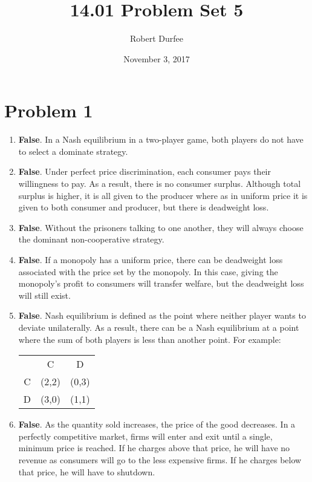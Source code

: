 \documentclass{article}
\title{14.01 Problem Set 5}
\author{Robert Durfee}
\date{November 3, 2017}
\begin{document}
\maketitle

\section*{Problem 1}

\begin{enumerate}
    \item \textbf{False}. In a Nash equilibrium in a two-player game, both
        players do not have to select a dominate strategy.
    \item \textbf{False}. Under perfect price discrimination, each consumer pays
        their willingness to pay. As a result, there is no consumer surplus.
        Although total surplus is higher, it is all given to the producer where
        as in uniform price it is given to both consumer and producer, but there
        is deadweight loss.
    \item \textbf{False}. Without the prisoners talking to one another, they
        will always choose the dominant non-cooperative strategy.
    \item \textbf{False}. If a monopoly has a uniform price, there can be
        deadweight loss associated with the price set by the monopoly. In this
        case, giving the monopoly's profit to consumers will transfer welfare,
        but the deadweight loss will still exist.
    \item \textbf{False}. Nash equilibrium is defined as the point where neither
        player wants to deviate unilaterally. As a result, there can be a Nash
        equilibrium at a point where the sum of both players is less than
        another point. For example:
        \begin{center}
            \begin{tabular}{c c c}
                 & C & D \\
                C & (2,2) & (0,3) \\
                D & (3,0) & (1,1)
            \end{tabular}
        \end{center}
    \item \textbf{False}. As the quantity sold increases, the price of the good
        decreases. In a perfectly competitive market, firms will enter and exit
        until a single, minimum price is reached. If he charges above that
        price, he will have no revenue as consumers will go to the less
        expensive firms. If he charges below that price, he will have to
        shutdown.
\end{enumerate}
\end{document}
